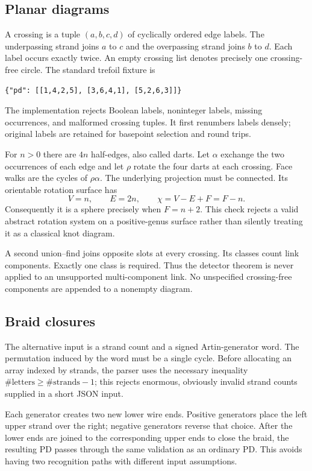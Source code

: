 \documentclass[11pt]{article}
\theoremstyle{remark}\newtheorem{remark}[theorem]{Remark}
\begin{document}
\subsection{Planar diagrams}
A crossing is a tuple $(a,b,c,d)$ of cyclically ordered edge labels. The
underpassing strand joins $a$ to $c$ and the overpassing strand joins $b$ to $d$.
Each label occurs exactly twice. An empty crossing list denotes precisely one
crossing-free circle. The standard trefoil fixture is
\cite{katlas}
\begin{lstlisting}
{"pd": [[1,4,2,5], [3,6,4,1], [5,2,6,3]]}
\end{lstlisting}
The implementation rejects Boolean labels, noninteger labels, missing
occurrences, and malformed crossing tuples. It first renumbers labels densely;
original labels are retained for basepoint selection and round trips.

For $n>0$ there are $4n$ half-edges, also called darts. Let $\alpha$ exchange the
two occurrences of each edge and let $\rho$ rotate the four darts at each
crossing. Face walks are the cycles of $\rho\alpha$. The underlying projection
must be connected. Its orientable rotation surface has
\[
 V=n,\qquad E=2n,\qquad \chi=V-E+F=F-n.
\]
Consequently it is a sphere precisely when $F=n+2$. This check rejects a valid
abstract rotation system on a positive-genus surface rather than silently
treating it as a classical knot diagram.

A second union--find joins opposite slots at every crossing. Its classes count
link components. Exactly one class is required. Thus the detector theorem is
never applied to an unsupported multi-component link. No unspecified
crossing-free components are appended to a nonempty diagram.

\subsection{Braid closures}
The alternative input is a strand count and a signed Artin-generator word.
The permutation induced by the word must be a single cycle. Before allocating
an array indexed by strands, the parser uses the necessary inequality
$\#\text{letters}\geq\#\text{strands}-1$; this rejects enormous, obviously
invalid strand counts supplied in a short JSON input.

Each generator creates two new lower wire ends. Positive generators place the
left upper strand over the right; negative generators reverse that choice.
After the lower ends are joined to the corresponding upper ends to close the
braid, the resulting PD passes through the same validation as an ordinary PD.
This avoids having two recognition paths with different input assumptions.
\end{document}
